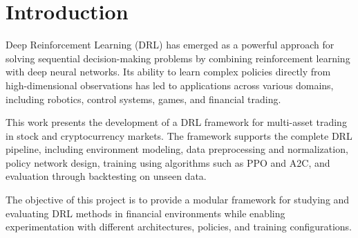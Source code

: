 \section{Introduction}

Deep Reinforcement Learning (DRL) has emerged as a powerful approach for 
solving sequential decision-making problems by combining reinforcement 
learning with deep neural networks. Its ability to learn complex policies 
directly from high-dimensional observations has led to applications across
various domains, including robotics, control systems, games, and financial trading.

This work presents the development of a DRL framework for multi-asset trading in stock 
and cryptocurrency markets. The framework supports the complete DRL pipeline, including 
environment modeling, data preprocessing and normalization, policy network design, training 
using algorithms such as PPO and A2C, and evaluation through backtesting on unseen data.

The objective of this project is to provide a modular framework for studying and evaluating 
DRL methods in financial environments while enabling experimentation with different 
architectures, policies, and training configurations.